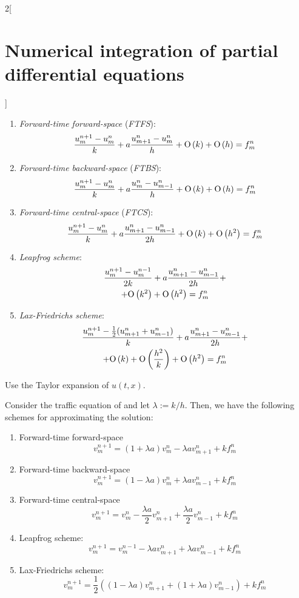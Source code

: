 \documentclass[../../../main_math.tex]{subfiles}
\begin{document}
\begin{multicols}{2}[\section{Numerical integration of partial differential equations}]
\begin{proposition}
\begin{enumerate}
      \item \emph{Forward-time forward-space} (\emph{FTFS}):
            $$\frac{u_m^{n+1}-u_m^n}{k}+a\frac{u_{m+1}^n-u_m^n}{h}+\mathrm{O}\left(k\right)+\mathrm{O}\left(h\right)=f_m^n$$
      \item \emph{Forward-time backward-space} (\emph{FTBS}):
            $$\frac{u_m^{n+1}-u_m^n}{k}+a\frac{u_{m}^n-u_{m-1}^n}{h}+\mathrm{O}\left(k\right)+\mathrm{O}\left(h\right)=f_m^n$$
      \item \emph{Forward-time central-space} (\emph{FTCS}):
            $$\frac{u_m^{n+1}-u_m^n}{k}+a\frac{u_{m+1}^n-u_{m-1}^n}{2h}+\mathrm{O}\left(k\right)+\mathrm{O}\left(h^2\right)=f_m^n$$
      \item \emph{Leapfrog scheme}:
            \begin{multline*}
              \frac{u_m^{n+1}-u_m^{n-1}}{2k}+a\frac{u_{m+1}^n-u_{m-1}^n}{2h}+\\+\mathrm{O}\left(k^2\right)+\mathrm{O}\left(h^2\right)=f_m^n
            \end{multline*}
      \item \emph{Lax-Friedrichs scheme}:
            \begin{multline*}
              \frac{u_m^{n+1}-\frac{1}{2}(u_{m+1}^n+u_{m-1}^n)}{k}+a\frac{u_{m+1}^n-u_{m-1}^n}{2h} + \\ + \mathrm{O}\left(k\right)+\mathrm{O}\left(\frac{h^2}{k}\right)+\mathrm{O}\left(h^2\right)=f_m^n
            \end{multline*}
    \end{enumerate}
  \end{proposition}
  \begin{sproof}
    Use the Taylor expansion of $u(t,x)$.
  \end{sproof}
  \begin{corollary}
    Consider the traffic equation of  and let $\lambda:=k/h$. Then, we have the following schemes for approximating the solution:
    \begin{enumerate}
      \item Forward-time forward-space
            $$\displaystyle v_m^{n+1}=(1+\lambda a)v_m^n-\lambda av_{m+1}^n+kf_m^n$$
      \item Forward-time backward-space
            $$\displaystyle v_m^{n+1}=(1-\lambda a)v_m^n+\lambda av_{m-1}^n+kf_m^n$$
      \item Forward-time central-space
            $$\displaystyle v_m^{n+1}=v_m^n-\frac{\lambda a}{2}v_{m+1}^n+\frac{\lambda a}{2}v_{m-1}^n+kf_m^n$$
      \item Leapfrog scheme: $$v_m^{n+1}=v_m^{n-1}-\lambda av_{m+1}^n+\lambda av_{m-1}^n+kf_m^n$$
      \item Lax-Friedrichs scheme: $$v_m^{n+1}=\frac{1}{2}\left((1-\lambda a)v_{m+1}^n+(1+\lambda a)v_{m-1}^n\right)+kf_m^n$$
    \end{enumerate}
  \end{corollary}

\end{multicols}
\end{document}

